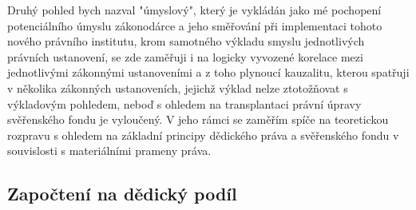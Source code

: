 \documentclass{article}
\begin{document}

Druhý pohled bych nazval "úmyslový", který je vykládán jako mé pochopení potenciálního úmyslu zákonodárce a jeho směřování při implementaci tohoto nového právního institutu, krom samotného výkladu smyslu jednotlivých právních ustanovení, se zde zaměřuji i na logicky vyvozené korelace mezi jednotlivými zákonnými ustanoveními a z toho plynoucí kauzalitu, kterou spatřuji v několika zákonných ustanoveních, jejichž výklad nelze ztotožňovat s výkladovým pohledem, neboď s ohledem na transplantaci právní úpravy svěřenského fondu je vyloučený. V jeho rámci se zaměřím spíče na teoretickou rozpravu s ohledem na základní principy dědického práva a svěřenského fondu v souvislosti s materiálními prameny práva.\\






\subsection{Započtení na dědický podíl}
\end{document}

